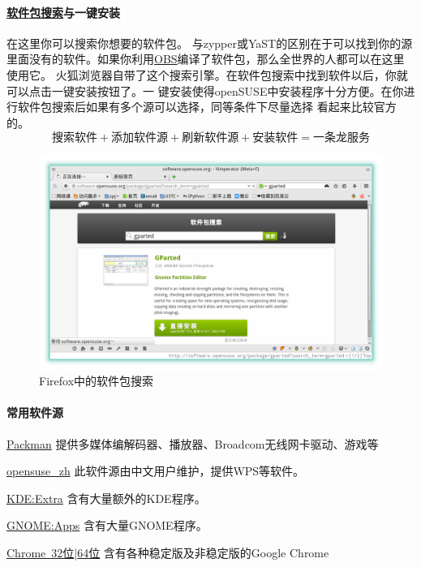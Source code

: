 \documentclass[11pt,openany]{book}
\newcommand{\zy}{zypper或YaST}
\begin{document}
\paragraph[软件包搜索与一键安装]{\href{http://software.opensuse.org/packages}{软件包搜索}与一键安装} 在这里你可以搜索你想要的软件包。
与\zy 的区别在于可以找到你的源里面没有的软件。如果你利用\href{https://build.opensuse.org/}{OBS}编译了软件包，那么全世界的人都可以在这里使用它。
火狐浏览器自带了这个搜索引擎。在软件包搜索中找到软件以后，你就可以点击一键安装按钮了。一
键安装使得openSUSE中安装程序十分方便。在你进行软件包搜索后如果有多个源可以选择，同等条件下尽量选择
看起来比较官方的。\[\text{搜索软件}+\text{添加软件源}+\text{刷新软件源}+\text{安装软件}=\text{一条龙服务}\]
\begin{figure}[htb]
\centering
\includegraphics[width=\textwidth]{./pic/software.png} 
\caption{Firefox中的软件包搜索}\label{soft}
\end{figure}

\paragraph{常用软件源}\label{repo}

\begin{compactdesc}
 \item[\href{http://mirrors.hust.edu.cn/packman/suse/openSUSE_13.2/}{Packman}]
 提供多媒体编解码器、播放器、Broadcom无线网卡驱动、游戏等
 \item[\href{http://download.opensuse.org/repositories/home:/opensuse_zh/openSUSE_13.2/}{opensuse\_zh}]
 此软件源由中文用户维护，提供WPS等软件。
 \item[\href{http://download.opensuse.org/repositories/KDE:/Extra/openSUSE_13.2/}{KDE:Extra}]
 含有大量额外的KDE程序。
 \item[\href{http://download.opensuse.org/repositories/GNOME:/Apps/openSUSE_13.2/}{GNOME:Apps}]
 含有大量GNOME程序。
 \item[\href{http://dl.google.com/linux/chrome/rpm/stable/i386}{Chrome~32位}|\href{http://dl.google.com/linux/chrome/rpm/stable/x86_64}{64位}] 含有各种稳定版及非稳定版的Google Chrome
\end{compactdesc}
\end{document}

